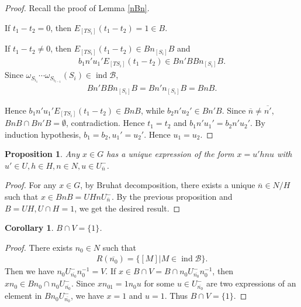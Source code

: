 \documentclass[12pt]{amsart}
\newtheorem{corollary}[theorem]{Corollary}
\newtheorem{proposition}[theorem]{Proposition}
\begin{document}
\begin{proof}
    Recall the proof of Lemma \ref{nBn}.
    
    If $t_1-t_2 = 0$, then $E_{[TS_i]}(t_1-t_2) = 1\in B$.

    If $t_1-t_2 \neq 0$, then $E_{[TS_i]}(t_1-t_2) \in Bn_{[S_i]}B$ and 
    \begin{align*}
        b_1n'u_1'E_{[TS_i]}(t_1-t_2) \in Bn'BBn_{[S_i]}B.
    \end{align*} 
    Since $\omega_{S_{i_1}} \cdots \omega_{S_{i_{l-1}}}(S_{i}) \in \operatorname{ind}\mathcal{B} $, 
    \begin{align*}
        Bn'BBn_{[S_i]}B = Bn'n_{[S_i]}B = BnB.
    \end{align*}

    Hence $  b_1n'u_1'E_{[TS_i]}(t_1-t_2) \in BnB$, while $b_2n'u_2' \in Bn'B$.
    Since $\overline{n}\neq \overline{n'}$, $BnB\cap Bn'B = \emptyset$, contradiction.
    Hence $t_1 = t_2$ and $b_1n'u_1' = b_2n'u_2'$. 
    By induction hypothesis, $b_1=b_2,u_1'=u_2'$. Hence $u_1=u_2$.
\end{proof}

\begin{proposition}
    Any $x\in G$ has a unique expression of the form $x=u'hnu$ with $u'\in U,h\in H,n\in N,u\in U_{\overline{n}}^- $.
\end{proposition}

\begin{proof}
    For any $ x\in G$, by Bruhat decomposition, there exists a unique $\overline{n} \in N/H$ such that $x\in BnB=UHnU_{\overline{n}}^-$.
    By the previous proposition and $B=UH,U\cap H=1$, we get the desired result.
\end{proof}

\begin{corollary}
    $B\cap V = \{1\}$.
\end{corollary}

\begin{proof}
    There exists $n_0\in N$ such that 
    \begin{align*}
        R(\overline{n_0}) = \{ [M]| M \in \operatorname{ind}\mathcal{B} \}.
    \end{align*} 
    Then we have $n_0U_{\overline{n_0}}^- n_0^{-1} = V$.
    If $x\in B\cap V = B\cap n_0U_{\overline{n_0}}^- n_0^{-1}$, then $xn_0\in Bn_0\cap n_0U_{\overline{n_0}}^- $.
    Since $xn_01=1n_0u$ for some $u\in U_{\overline{n_0}}^- $ are two expressions of an element in $Bn_0U_{\overline{n_0}}^- $, we have $x=1$ and $u=1$.
    Thus  $B\cap V = \{1\}$.
\end{proof}
\end{document}
